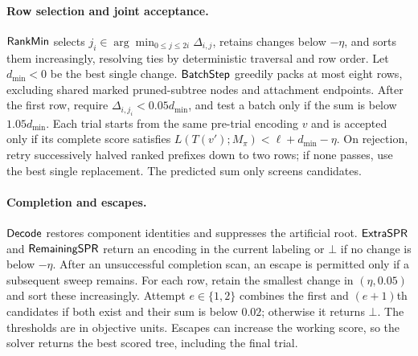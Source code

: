 \paragraph{Row selection and joint acceptance.}
$\mathsf{RankMin}$ selects $j_i\in\arg\min_{0\leq j\leq2i}\Delta_{i,j}$, retains changes below $-\eta$, and sorts them increasingly, resolving ties by deterministic traversal and row order.
Let $d_{\min}<0$ be the best single change.
$\mathsf{BatchStep}$ greedily packs at most eight rows, excluding shared marked pruned-subtree nodes and attachment endpoints.
After the first row, require $\Delta_{i,j_i}<0.05d_{\min}$, and test a batch only if the sum is below $1.05d_{\min}$.
Each trial starts from the same pre-trial encoding $v$ and is accepted only if its complete score satisfies
$L(T(v');M_\pi)<\ell+d_{\min}-\eta$.
On rejection, retry successively halved ranked prefixes down to two rows; if none passes, use the best single replacement.
The predicted sum only screens candidates.

\paragraph{Completion and escapes.}
$\mathsf{Decode}$ restores component identities and suppresses the artificial root.
$\mathsf{ExtraSPR}$ and $\mathsf{RemainingSPR}$ return an encoding in the current labeling or $\bot$ if no change is below $-\eta$.
After an unsuccessful completion scan, an escape is permitted only if a subsequent sweep remains.
For each row, retain the smallest change in $(\eta,0.05)$ and sort these increasingly.
Attempt $e\in\{1,2\}$ combines the first and $(e+1)$th candidates if both exist and their sum is below $0.02$; otherwise it returns $\bot$.
The thresholds are in objective units.
Escapes can increase the working score, so the solver returns the best scored tree, including the final trial.

